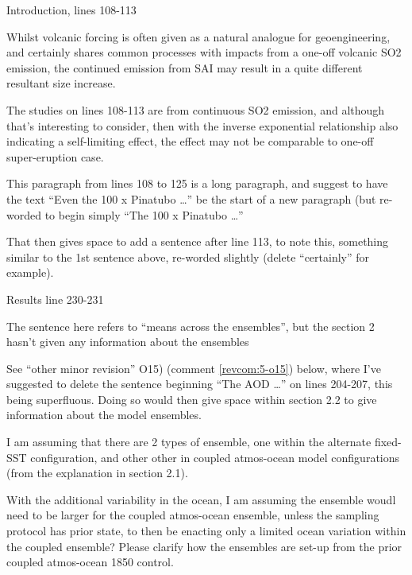 \documentclass{reviewresponse}
\begin{document}
  \begin{revcomment}[after title={: M4},colframe={colorcommentresolved}]
    Introduction, lines 108-113

    Whilst volcanic forcing is often given as a natural analogue for geoengineering, and
    certainly shares common processes with impacts from a one-off volcanic SO2 emission,
    the continued emission from SAI may result in a quite different resultant size
    increase.

    The studies on lines 108-113 are from continuous SO2 emission, and although that's
    interesting to consider, then with the inverse exponential relationship also
    indicating a self-limiting effect, the effect may not be comparable to one-off
    super-eruption case.

    This paragraph from lines 108 to 125 is a long paragraph, and suggest to have the
    text ``Even the 100 x Pinatubo \ldots'' be the start of a new paragraph (but
    re-worded to begin simply ``The 100 x Pinatubo \ldots''

    That then gives space to add a sentence after line 113, to note this, something
    similar to the 1st sentence above, re-worded slightly (delete ``certainly'' for
    example).
  \end{revcomment}
  \begin{revcomment}[after title={: M5},colframe={colorcommentresolved}]
    Results line 230-231

    The sentence here refers to ``means across the ensembles'', but the section 2 hasn't
    given any information about the ensembles

    See ``other minor revision'' O15) (comment \ref{revcom:5-o15}) below, where I've
    suggested to delete the sentence beginning ``The AOD \ldots'' on lines 204-207, this
    being superfluous. Doing so would then give space within section 2.2 to give
    information about the model ensembles.

    I am assuming that there are 2 types of ensemble, one within the alternate fixed-SST
    configuration, and other other in coupled atmos-ocean model configurations (from the
    explanation in section 2.1).

    With the additional variability in the ocean, I am assuming the ensemble woudl need
    to be larger for the coupled atmos-ocean ensemble, unless the sampling protocol has
    prior state, to then be enacting only a limited ocean variation within the coupled
    ensemble? Please clarify how the ensembles are set-up from the prior coupled
    atmos-ocean 1850 control.
  \end{revcomment}
\end{document}
